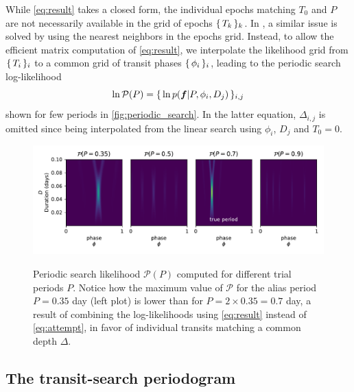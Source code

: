 \documentclass[modern]{aastex631}
\begin{document}
While \autoref{eq:result} takes a closed form, the individual epochs matching $T_0$ and $P$ are not necessarily available in the grid of epochs $\{\,T_k\,\}_k$. In \cite{foreman2016}, a similar issue is solved by using the nearest neighbors in the epochs grid. Instead, to allow the efficient matrix computation of \autoref{eq:result}, we interpolate the likelihood grid from $\{\,T_i\,\}_i$ to a common grid of transit phases $\{\,\phi_i\,\}_i$, leading to the periodic search log-likelihood
$$\ln\mathcal{P}(P) = \{\,\ln p(\bm{f} \vert P, \phi_i, D_j)\,\}_{i,j}$$
shown for few periods in \autoref{fig:periodic_search}. In the latter equation, $\Delta_{i,j}$ is omitted since being interpolated from the linear search using $\phi_i$, $D_j$ and $T_0 = 0$.

\begin{figure}[H]
    \centering
    \includegraphics[width=\linewidth]{./principle_periodic_1.pdf}\\
    \caption{Periodic search likelihood $\mathcal{P}(P)$ computed for different trial periods $P$. Notice how the maximum value of $\mathcal{P}$ for the alias period $P=0.35$ day (left plot) is lower than for $P=2\times 0.35=0.7$ day, a result of combining the log-likelihoods using \autoref{eq:result} instead of \autoref{eq:attempt}, in favor of individual transits matching a common depth $\Delta$. }
    \label{fig:periodic_search}
\end{figure}

\subsection{The transit-search periodogram}\label{periodogram}
\end{document}
